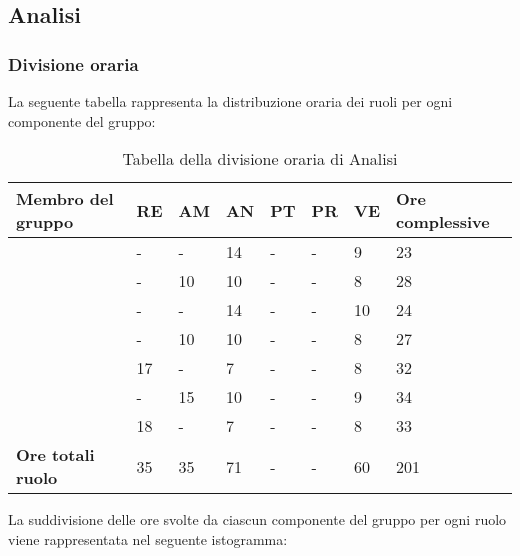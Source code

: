 \subsection{Analisi}

\subsubsection{Divisione oraria}
La seguente tabella rappresenta la distribuzione oraria dei ruoli per ogni componente del gruppo:
{

\renewcommand{\arraystretch}{2}
\begin{longtable}[h!] { C{4cm} C{1cm} C{1cm} C{1cm} C{1cm} C{1cm} C{1cm} C{3cm}}
\caption{Tabella della divisione oraria di Analisi}	\\
\rowcolor{\primaryColor}

\textcolor{\secondaryColor}{\textbf{Membro del gruppo}} & 
\textcolor{\secondaryColor}{\textbf{RE}} & 
\textcolor{\secondaryColor}{\textbf{AM}} & 
\textcolor{\secondaryColor}{\textbf{AN}} & 
\textcolor{\secondaryColor}{\textbf{PT}} & 
\textcolor{\secondaryColor}{\textbf{PR}} & 
\textcolor{\secondaryColor}{\textbf{VE}} & 
\textcolor{\secondaryColor}{\textbf{Ore complessive}}\\	
\endhead
\AW{}                     &  - &  - &  14 & - & - & 9 & 23 \\
\AT{}                     &  - &  10 & 10 & - & - & 8 & 28 \\
\AD{}                     &  - &  - &  14 & - & - & 10 & 24 \\
\EC{}                     &  - &  10 & 10 & - & - & 8 & 27 \\
\EM{}                     &  17 &  - & 7 & - & - & 8 & 32 \\
\FP{}                     &  - &  15 & 10 & - & - & 9 & 34 \\
\GG{}                     & 18 &  - &  7 & - & - & 8 & 33 \\
\textbf{Ore totali ruolo} & 35 & 35 & 71 & - & - & 60 & 201 \\

\end{longtable}
}
La suddivisione delle ore svolte da ciascun componente del gruppo per ogni ruolo viene rappresentata nel seguente istogramma:
